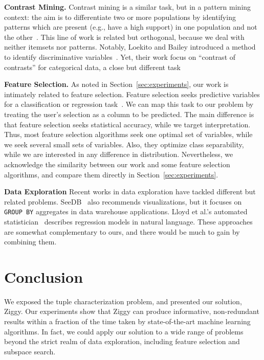 \textbf{Contrast Mining.} Contrast mining is a similar task, but in a pattern
mining context: the aim is to differentiate two or more populations by
identifying patterns which are present (e.g., have a high support) in one
population and not the
other~\cite{vreeken2007characterising,webb2008detecting}. This line of work is
related but orthogonal, because we deal with neither itemsets nor patterns.
Notably, Loekito and Bailey introduced a  method to identify discriminative 
variables~\cite{loekito2008mining}.  Yet, their work focus on ``contrast of
contrasts'' for categorical data, a close but different task

\textbf{Feature Selection.} As noted in Section~\ref{sec:experiments}, our work
is intimately related to feature selection. Feature selection seeks predictive
variables for a classification or regression task~\cite{guyon2003introduction}.
We can map this task to our problem by treating the user's selection as a
column to be predicted. The main difference is that feature selection seeks
statistical accuracy, while we target interpretation. Thus, most feature
selection algorithms seek one optimal set of variables, while we seek several
small sets of variables. Also, they optimize class separability,
while we are interested in any difference in distribution. Nevertheless, we
acknowledge the similarity between our work and some feature selection
algorithms, and compare them directly in Section~\ref{sec:experiments}.

\textbf{Data Exploration} Recent works in data exploration have tackled
different but related problems. SeeDB~\cite{vartak2015see} also re\-com\-mends
visualizations, but it focuses on \texttt{GROUP BY} aggregates in data
warehouse applications. Lloyd et al.'s automated statistician~\cite{Lloyd2014ABCD}
describes regression models in natural language. These approaches are somewhat
complementary to ours, and there would be much to gain by combining them.


\section{Conclusion}
\label{sec:conclusions}
We exposed the tuple characterization problem, and presented our solution,
Ziggy. Our experiments show that Ziggy can produce informative, non-redundant
results within a fraction of the time taken by state-of-the-art machine
learning algorithms. In fact,  we could apply our solution to a wide range of
problems beyond the strict realm of data exploration, including feature
selection and subspace search.

